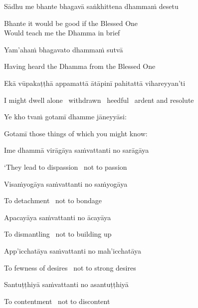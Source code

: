 Sādhu me bhante bhagavā saṅkhittena dhammaṁ desetu

\begin{english}
  Bhante it would be good if the Blessed One\\
  Would teach me the Dhamma in brief
\end{english}

Yam'ahaṁ bhagavato dhammaṁ sutvā

\begin{english}
  Having heard the Dhamma from the Blessed One
\end{english}

Ekā vūpakaṭṭhā appamattā ātāpinī pahitattā vihareyyan'ti

\begin{english}
  I might dwell alone \breathmark\ withdrawn \breathmark\ heedful \breathmark\ ardent and resolute
\end{english}

Ye kho tvaṁ gotamī dhamme jāneyyāsi:

\begin{english}
  Gotamī those things of which you might know:
\end{english}

Ime dhammā virāgāya saṁvattanti no sarāgāya

\begin{english}
  `They lead to dispassion \breathmark\ not to passion
\end{english}

Visaṁyogāya saṁvattanti no saṁyogāya

\begin{english}
  To detachment \breathmark\ not to bondage
\end{english}

Apacayāya saṁvattanti no ācayāya

\begin{english}
  To dismantling \breathmark\ not to building up
\end{english}

App'icchatāya saṁvattanti no mah'icchatāya

\begin{english}
  To fewness of desires \breathmark\ not to strong desires
\end{english}

Santuṭṭhiyā saṁvattanti no asantuṭṭhiyā

\begin{english}
  To contentment \breathmark\ not to discontent
\end{english}

